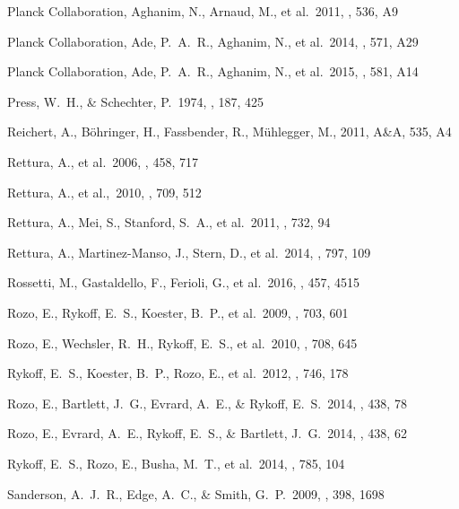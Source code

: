 \documentclass[apj,twocolumn]{emulateapj}
\begin{document}
{\begin{thebibliography}{88}
 Planck Collaboration, Aghanim, N., Arnaud, M., et al.\ 2011, \aap, 536, A9 

 Planck Collaboration, Ade, P.~A.~R., Aghanim, N., et al.\ 2014, \aap, 571, A29 

 Planck Collaboration, Ade, P.~A.~R., Aghanim, N., et al.\ 2015, \aap, 581, A14 

 Press, W.~H., \& Schechter, P.\ 1974, \apj, 187, 425 

 Reichert, A., B\"ohringer, H., Fassbender, R., M\"uhlegger, M., 2011, A\&A, 535, A4

 Rettura, A., et al.\ 2006, \aap, 458, 717 

 Rettura, A., et al.,\ 2010, \apj, 709, 512 

 Rettura, A., Mei, S., Stanford, S.~A., et al.\ 2011, \apj, 732, 94 

 Rettura, A., Martinez-Manso, J., Stern, D., et al.\ 2014, \apj, 797, 109 

 Rossetti, M., Gastaldello, F., Ferioli, G., et al.\ 2016, \mnras, 457, 4515 

 Rozo, E., Rykoff, E.~S., Koester, B.~P., et al.\ 2009, \apj, 703, 601 

 Rozo, E., Wechsler, R.~H., Rykoff, E.~S., et al.\ 2010, \apj, 708, 645 

 Rykoff, E.~S., Koester, B.~P., Rozo, E., et al.\ 2012, \apj, 746, 178 

 Rozo, E., Bartlett, J.~G., Evrard, A.~E., \& Rykoff, E.~S.\ 2014, \mnras, 438, 78 

 Rozo, E., Evrard, A.~E., Rykoff, E.~S., \& Bartlett, J.~G.\ 2014, \mnras, 438, 62 

 Rykoff, E.~S., Rozo, E., Busha, M.~T., et al.\ 2014, \apj, 785, 104 

 Sanderson, A.~J.~R., Edge, A.~C., \& Smith, G.~P.\ 2009, \mnras, 398, 1698 


\end{thebibliography}}
\end{document}
